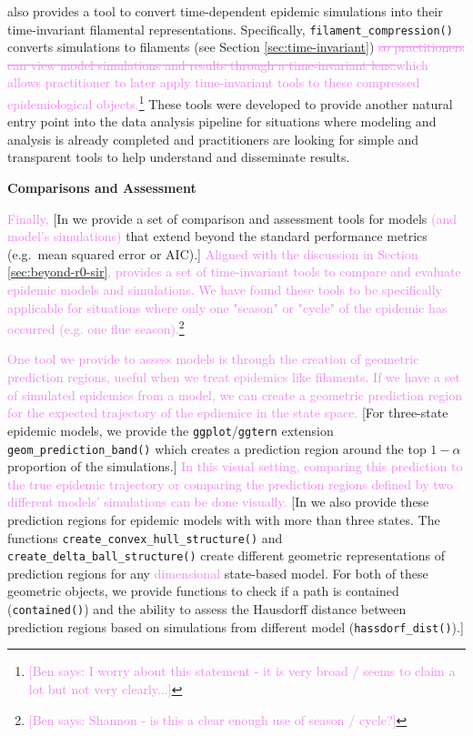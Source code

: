 \documentclass[
  shortnames]{jss}
\begin{document}
 also provides a tool to convert time-dependent epidemic
simulations into their time-invariant filamental representations.
Specifically, \texttt{filament\_compression()} converts simulations to
filaments (see Section \ref{sec:time-invariant})
\textcolor{violet}{\sout{so practitioners can view model simulations and results through a time-invariant lens.}which allows practitioner to later apply time-invariant tools to these compressed epidemiological objects.}\footnote{\textcolor{violet}{[Ben says: I worry about this statement - it is very broad / seems to claim a lot but not very clearly...]}}
These tools were developed to provide another natural entry point into
the  data analysis pipeline for situations where
modeling and analysis is already completed and practitioners are looking
for simple and transparent tools to help understand and disseminate
results.

\textbf{Comparisons and Assessment}

\textcolor{violet}{Finally,} {[}In  we provide a set of
comparison and assessment tools for models
\textcolor{violet}{(and model's simulations)} that extend beyond the
standard performance metrics (e.g.~mean squared error or AIC).{]}
\textcolor{violet}{Aligned with the discussion in Section \ref{sec:beyond-r0-sir},  provides a set of time-invariant tools to compare and evaluate epidemic models and simulations. We have found these tools to be specifically applicable for situations where only one "season" or "cycle" of the epidemic has occurred (e.g. one flue season).}\footnote{\textcolor{violet}{[Ben says: Shannon - is this a clear enough use of season / cycle?]}}

\textcolor{violet}{One tool we provide to assess models is through the creation of geometric prediction regions, useful when we treat epidemics like filaments. If we have a set of simulated epidemics from a model, we can create a geometric prediction region for the expected trajectory of the epdiemice in the state space.}
{[}For three-state epidemic models, we provide the
\texttt{ggplot}/\texttt{ggtern} extension
\texttt{geom\_prediction\_band()} which creates a prediction region
around the top \(1-\alpha\) proportion of the simulations.{]}
\textcolor{violet}{In this visual setting, comparing this prediction to the true epidemic trajectory or comparing the prediction regions defined by two different models' simulations can be done visually.}
{[}In  we also provide these prediction regions for
epidemic models with with more than three states. The functions
\texttt{create\_convex\_hull\_structure()} and
\texttt{create\_delta\_ball\_structure()} create different geometric
representations of prediction regions for any
\textcolor{violet}{dimensional} state-based model. For both of these
geometric objects, we provide functions to check if a path is contained
(\texttt{contained()}) and the ability to assess the Hausdorff distance
between prediction regions based on simulations from different model
(\texttt{hassdorf\_dist()}).{]}
\end{document}
